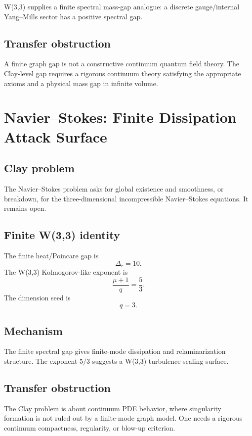 \documentclass[11pt]{article}
\theoremstyle{definition}
\newcommand{\Deltar}{\Delta_r}
\begin{document}
W(3,3) supplies a finite spectral mass-gap analogue: a discrete gauge/internal Yang--Mills sector has a positive spectral gap.

\subsection{Transfer obstruction}

A finite graph gap is not a constructive continuum quantum field theory.  The Clay-level gap requires a rigorous continuum theory satisfying the appropriate axioms and a physical mass gap in infinite volume.

\section{Navier--Stokes: Finite Dissipation Attack Surface}

\subsection{Clay problem}

The Navier--Stokes problem asks for global existence and smoothness, or breakdown, for the three-dimensional incompressible Navier--Stokes equations.  It remains open.

\subsection{Finite W(3,3) identity}

The finite heat/Poincare gap is
\[
  \Deltar=10.
\]
The W(3,3) Kolmogorov-like exponent is
\[
  \frac{\mu+1}{q}=\frac{5}{3}.
\]
The dimension seed is
\[
  q=3.
\]

\subsection{Mechanism}

The finite spectral gap gives finite-mode dissipation and relaminarization structure.  The exponent \(5/3\) suggests a W(3,3) turbulence-scaling surface.

\subsection{Transfer obstruction}

The Clay problem is about continuum PDE behavior, where singularity formation is not ruled out by a finite-mode graph model.  One needs a rigorous continuum compactness, regularity, or blow-up criterion.
\end{document}
